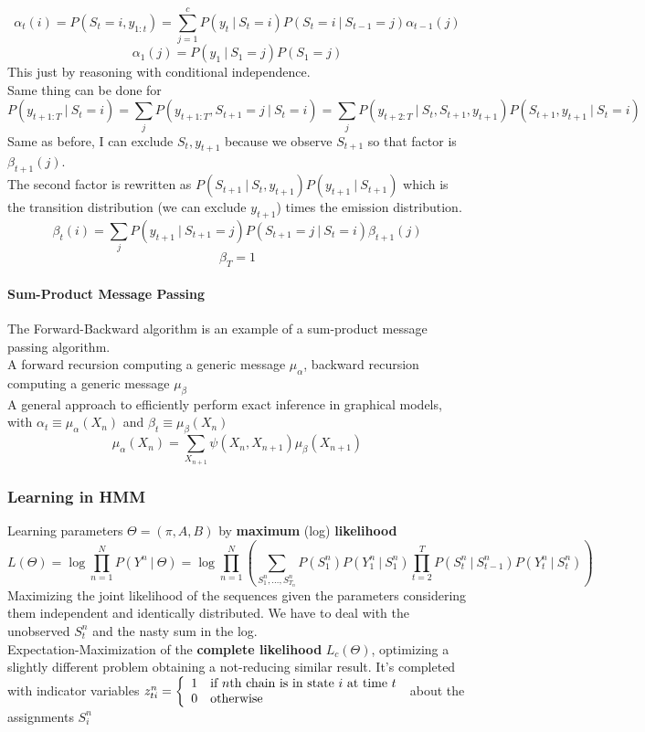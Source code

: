 \documentclass[10pt]{report}
\begin{document}
$$\alpha_t(i) = P(S_t=i,y_{1:t}) = \sum_{j=1}^c P(y_t\:|\:S_t=i) P(S_t=i\:|\:S_{t-1}=j)\alpha_{t-1}(j)$$
$$\alpha_1(j) = P(y_1\:|\:S_1=j)P(S_1=j)$$
This just by reasoning with conditional independence.\\
Same thing can be done for $$P(y_{t+1:T}\:|\:S_{t} = i) = \sum_j P(y_{t+1:T},S_{t+1}=j\:|\:S_t=i) = \sum_j P(y_{t+2:T}\:|\:S_t, S_{t+1},y_{t+1})P(S_{t+1},y_{t+1}\:|\:S_t=i)$$
Same as before, I can exclude $S_t, y_{t+1}$ because we observe $S_{t+1}$ so that factor is $\beta_{t+1}(j)$.\\
The second factor is rewritten as $P(S_{t+1}\:|\:S_t,y_{t+1})P(y_{t+1}\:|\:S_{t+1})$ which is the transition distribution (we can exclude $y_{t+1}$) times the emission distribution.
$$\beta_t(i) = \sum_j P(y_{t+1}\:|\:S_{t+1} = j)P(S_{t+1}=j\:|\:S_t=i)\beta_{t+1}(j)$$ %
$$\beta_T = 1$$
\paragraph{Sum-Product Message Passing} The Forward-Backward algorithm is an example of a sum-product message passing algorithm.\\
A forward recursion computing a generic message $\mu_\alpha$, backward recursion computing a generic message $\mu_\beta$\\
A general approach to efficiently perform exact inference in graphical models, with $\alpha_t \equiv \mu_\alpha(X_n)$ and $\beta_{t}\equiv \mu_\beta(X_n)$
$$\mu_\alpha(X_n) = \sum_{X_{n+1}} \psi(X_n, X_{n+1})\mu_\beta(X_{n+1})$$
\subsubsection{Learning in HMM}
Learning parameters $\Theta=(\pi,A,B)$ by \textbf{maximum} (log) \textbf{likelihood}
$$L(\Theta) = \log\prod_{n=1}^N P(Y^n\:|\:\Theta) = \log\prod_{n=1}^N\left(\sum_{S_1^n,\ldots,S_{T_n}^n} P(S_1^n)P(Y_1^n\:|\:S_1^n)\prod_{t=2}^T P(S_t^n\:|\:S_{t-1}^n)P(Y_t^n\:|\:S_t^n)\right)$$
Maximizing the joint likelihood of the sequences given the parameters considering them independent and identically distributed. We have to deal with the unobserved $S_t^n$ and the nasty sum in the log.\\
Expectation-Maximization of the \textbf{complete likelihood} $L_c(\Theta)$, optimizing a slightly different problem obtaining a not-reducing similar result. It's completed with indicator variables $z_{ti}^n=\left\{\begin{array}{c l}
1&\hbox{if }n\hbox{th chain is in state }i\hbox{ at time }t\\
0&\hbox{otherwise}
\end{array}\right.$ about the assignments $S_i^n$
\end{document}
